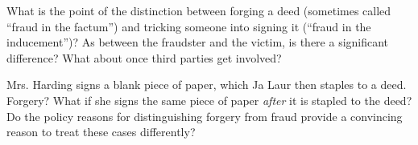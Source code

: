 
\item What is the point of the distinction between forging a deed (sometimes
called ``fraud in the factum'') and tricking someone into signing it (``fraud
in the inducement'')? As between the fraudster and the victim, is there a
significant difference? What about once third parties get involved?

\item Mrs. Harding signs a blank piece of paper, which Ja Laur then staples to a
deed. Forgery? What if she signs the same piece of paper \textit{after} it is
stapled to the deed? Do the policy reasons for distinguishing forgery from
fraud provide a convincing reason to treat these cases differently?

